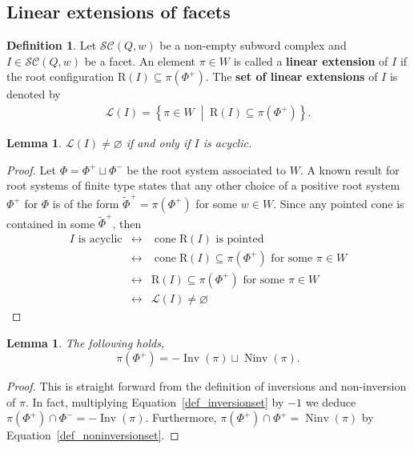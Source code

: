\documentclass{amsart}
\newtheorem{lemma}[theorem]{Lemma}
\theoremstyle{definition}
\newtheorem{definition}[theorem]{Definition}
\newcommand{\set}[2]{\left\{ #1 \;\middle|\; #2 \right\}} %
\DeclareMathOperator{\cone}{cone} %
\DeclareMathOperator{\Inv}{Inv} %
\DeclareMathOperator{\Ninv}{Ninv} %
\newcommand{\defn}[1]{\textbf{\textsf{\color{PineGreen} #1}}} %
\newcommand{\linearExtensions}{\mathcal{L}} %
\newcommand{\subwordComplex}{\mathcal{SC}} %
\newcommand{\Roots}{\mathrm{R}} %
\begin{document}
\subsection{Linear extensions of facets}

\begin{definition}
Let $\subwordComplex(Q,w)$ be a non-empty subword complex and $I\in \subwordComplex(Q,w)$ be a facet.
An element $\pi\in W$ is called a \defn{linear extension} of $I$ if the root configuration $\Roots(I)\subseteq \pi(\Phi^+)$.
The \defn{set of linear extensions} of $I$ is denoted by
\begin{align}
\linearExtensions(I)=
\set{\pi\in W}{\Roots(I)\subseteq \pi(\Phi^+)}.   
\end{align}
\end{definition}

\begin{lemma}
\label{lem_acyclic_nonempty}
$\linearExtensions(I)\neq \varnothing$ if and only if $I$ is acyclic.
\end{lemma}
\begin{proof}
Let $\Phi=\Phi^+\sqcup\Phi^-$ be the root system associated to $W$.
A known result for root systems of finite type states that any other choice of a positive root system $\Phi^+$ for $\Phi$ is of the form $\widetilde \Phi^+=\pi(\Phi^+)$ for some $w\in W$.
Since any pointed cone is contained in some $\widetilde \Phi^+$, then 
\[
\begin{array}{rcl}
I \text{ is acyclic}  & \longleftrightarrow  &  \cone \Roots(I) \text{ is pointed} \\
  & \longleftrightarrow  & \cone \Roots(I)\subseteq \pi(\Phi^+) \text{ for some } \pi\in W \\
  & \longleftrightarrow  &  \Roots(I)\subseteq \pi(\Phi^+) \text{ for some } \pi\in W \\
  & \longleftrightarrow  &  \linearExtensions(I) \neq \varnothing 
\end{array}
\]
\end{proof}

\begin{lemma}
\label{lem_pi_phiplus_inv_ninv}
The following holds,
\[
\pi(\Phi^+)=-\Inv(\pi)\sqcup \Ninv(\pi).
\]
\end{lemma}

\begin{proof}
This is straight forward from the definition of inversions and non-inversion of $\pi$.
In fact, multiplying Equation~\eqref{def_inversionset} by $-1$ we deduce $\pi(\Phi^+)\cap \Phi^-=-\Inv(\pi)$.
Furthermore,  
$\pi(\Phi^+)\cap \Phi^+=\Ninv(\pi)$ by Equation~\eqref{def_noninversionset}.
\end{proof}
\end{document}
